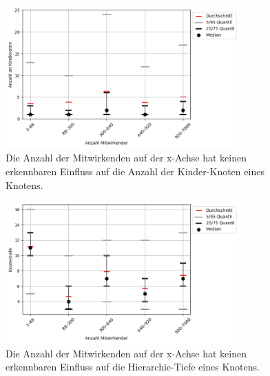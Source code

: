 \begin{figure}
    \centering
    \includegraphics[width=0.8\textwidth]{images/datenanalyse/mitwirkendeVsKindknoten.png}
    \caption{Die Anzahl der Mitwirkenden auf der x-Achse hat keinen erkennbaren Einfluss auf die Anzahl der Kinder-Knoten eines Knotens.}
    \label{fig:mitwirkendeVsKindknoten}
\end{figure}

\begin{figure}
    \centering
    \includegraphics[width=0.8\textwidth]{images/datenanalyse/mitwirkendeVsTiefe.png}
    \caption{Die Anzahl der Mitwirkenden auf der x-Achse hat keinen erkennbaren Einfluss auf die Hierarchie-Tiefe eines Knotens.}
    \label{fig:mitwirkendeVsTiefe}
\end{figure}

